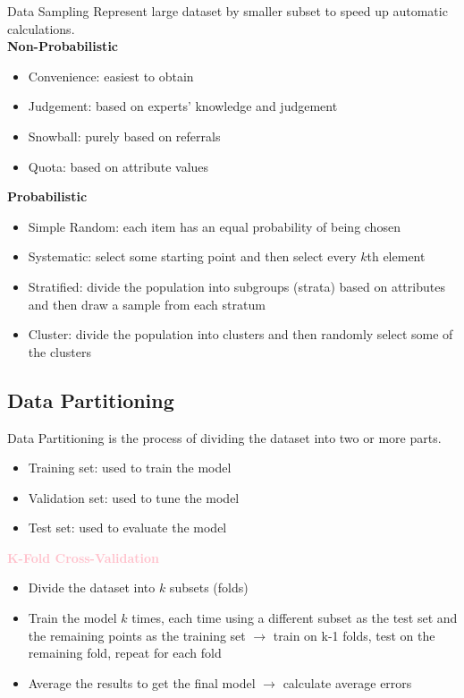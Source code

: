 \begin{definition}{Data Sampling}
    Represent large dataset by smaller subset to speed up automatic calculations.
    \vspace{1mm}\\
    \textbf{Non-Probabilistic}
    \begin{itemize}
        \item Convenience: easiest to obtain
        \item Judgement: based on experts' knowledge and judgement
        \item Snowball: purely based on referrals
        \item Quota: based on attribute values
    \end{itemize}
    \vspace{1mm}
    \textbf{Probabilistic}
    \begin{itemize}
        \item Simple Random: each item has an equal probability of being chosen
        \item Systematic: select some starting point and then select every $k$th element
        \item Stratified: divide the population into subgroups (strata) based on attributes and then draw a sample from each stratum
        \item Cluster: divide the population into clusters and then randomly select some of the clusters
    \end{itemize}
\end{definition}

\subsection{Data Partitioning}

\begin{definition}{Data Partitioning}
    is the process of dividing the dataset into two or more parts.
    \begin{itemize}
        \item Training set: used to train the model
        \item Validation set: used to tune the model
        \item Test set: used to evaluate the model
    \end{itemize}
    \vspace{1mm}
    \textcolor{pink}{\textbf{K-Fold Cross-Validation}}
    \begin{itemize}
        \item Divide the dataset into $k$ subsets (folds)
        \item Train the model $k$ times, each time using a different subset as the test set and the remaining points as the training set
        $\rightarrow$ train on k-1 folds, test on the remaining fold, repeat for each fold
        \item Average the results to get the final model $\rightarrow$ calculate average errors
    \end{itemize}
\end{definition}

